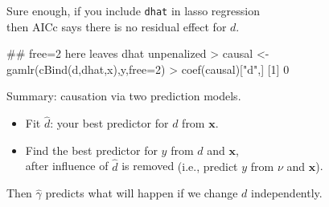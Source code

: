 \documentclass[11pt,xcolor=svgnames]{beamer}
\newcommand{\bk}{\color{black}}
\newcommand{\gr}{\color{black!60}}
\newcommand{\nv}{\color{Navy}}
\newcommand{\bm}[1]{\mathbf{#1}}
\newcommand{\sk}{\vspace{.5cm}}
\begin{document}
\begin{frame}[fragile]

{Sure enough, if you include {\tt dhat} in lasso regression \\then AICc says there is no residual effect for $d$.}

\begin{semiverbatim}\gr
## free=2 here leaves dhat unpenalized\nv
> causal <- gamlr(cBind(d,dhat,x),y,free=2)
> coef(causal)["d",] \bk
[1] 0
\end{semiverbatim}

Summary: causation via two prediction models.
\begin{itemize}
\item Fit $\hat d$: your best predictor for $d$ from $\bm{x}$.
\item Find the best predictor for $y$ from $d$ and $\bm{x}$, \\after influence of $\hat d$ is removed {\gr (i.e., predict $y$ from $\nu$ and $\bm{x}$)}.
\end{itemize}
Then $\hat \gamma$ predicts what will happen if we change $d$ independently.

\end{frame}






\end{document}
